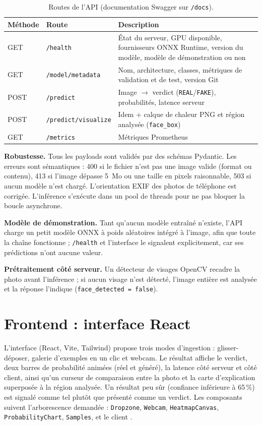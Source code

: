 \documentclass[11pt,a4paper]{article}
\DeclareRobustCommand{\fichier}[1]{\texttt{\StrSubstitute{\detokenize{#1}}{/}{/\allowbreak}}}
\begin{document}
\begin{table}[H]
\centering\small
\begin{tabularx}{\textwidth}{@{}ll>{\raggedright\arraybackslash}X@{}}
\toprule
\textbf{Méthode} & \textbf{Route} & \textbf{Description} \\
\midrule
GET & \texttt{/health} & État du serveur, GPU disponible, fournisseurs ONNX Runtime, version du modèle, modèle de démonstration ou non \\
GET & \texttt{/model/metadata} & Nom, architecture, classes, métriques de validation et de test, version Git \\
POST & \texttt{/predict} & Image $\rightarrow$ verdict (\texttt{REAL}/\texttt{FAKE}), probabilités, latence serveur \\
POST & \texttt{/predict/visualize} & Idem + calque de chaleur PNG et région analysée (\texttt{face\_box}) \\
GET & \texttt{/metrics} & Métriques Prometheus \\
\bottomrule
\end{tabularx}
\caption{Routes de l'API (documentation Swagger sur \texttt{/docs}).}
\end{table}

\textbf{Robustesse.} Tous les payloads sont validés par des schémas Pydantic. Les erreurs sont sémantiques :
400 si le fichier n'est pas une image valide (format ou contenu), 413 si l'image dépasse 5~Mo ou une taille en pixels
raisonnable, 503 si aucun modèle n'est chargé. L'orientation EXIF des photos de téléphone est corrigée. L'inférence
s'exécute dans un pool de threads pour ne pas bloquer la boucle asynchrone.

\textbf{Modèle de démonstration.} Tant qu'aucun modèle entraîné n'existe, l'API charge un petit modèle ONNX à poids
aléatoires intégré à l'image, afin que toute la chaîne fonctionne ; \texttt{/health} et l'interface le signalent
explicitement, car ses prédictions n'ont aucune valeur.

\textbf{Prétraitement côté serveur.} Un détecteur de visages OpenCV recadre la photo avant l'inférence ; si aucun
visage n'est détecté, l'image entière est analysée et la réponse l'indique (\texttt{face\_detected = false}).

\section{Frontend : interface React}

L'interface (React, Vite, Tailwind) propose trois modes d'ingestion : glisser-déposer, galerie d'exemples en un clic et
webcam. Le résultat affiche le verdict, deux barres de probabilité animées (réel et généré), la latence côté serveur et
côté client, ainsi qu'un curseur de comparaison entre la photo et la carte d'explication superposée à la région
analysée. Un résultat peu sûr (confiance inférieure à 65\,\%) est signalé comme tel plutôt que présenté comme un verdict.
Les composants suivent l'arborescence demandée : \texttt{Dropzone}, \texttt{Webcam}, \texttt{HeatmapCanvas},
\texttt{ProbabilityChart}, \texttt{Samples}, et le client \fichier{services/api.js}.
\end{document}
